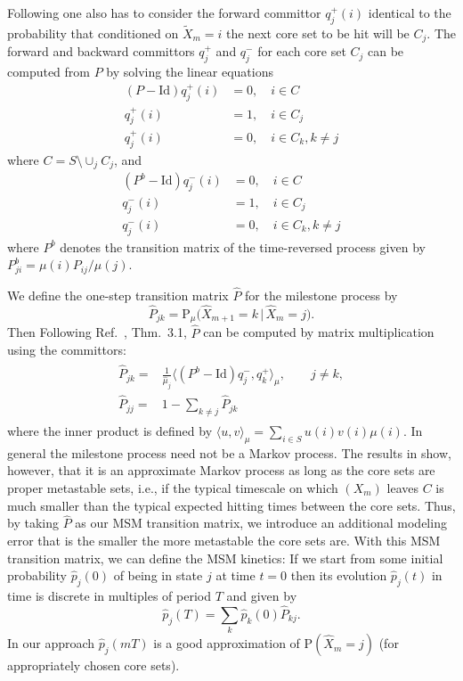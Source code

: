 \documentclass[journal=jctcce,manuscript=article]{achemso}
\newcommand{\vect}[1]{#1}
\newcommand{\fwd}[0]{+}
\newcommand{\bwd}[0]{-}
\newcommand{\id}{\mathrm{Id}}
\newcommand{\prob}{\textrm{P}}
\begin{document}
Following \cite{discreteTPT} one also has to consider the forward committor $q^\fwd_j(i)$ identical to the probability  that conditioned on $\tilde X_m=i$ the next core set to be hit will be $C_j$.
The forward and backward committors $q^\fwd_j$ and $q^\bwd_j$  for each core set $C_j$ can be computed from $P$ by solving the linear equations \cite{discreteTPT}
\begin{align}
(P-\id) q^\fwd_j(i) & =  0, \quad i\in C\label{qfwd}\\
q^\fwd_j(i) & =  1,\quad i\in C_j\nonumber\\
q^\fwd_j(i) & =  0,\quad i\in C_k,k\not=j\nonumber
\end{align}
where $C=S\setminus\cup_j C_j$, and
\begin{align}
(P^b-\id) q^\bwd_j(i) & =  0, \quad i\in C\label{qbwd}\\
q^\bwd_j(i) & =  1,\quad i\in C_j\nonumber \\
q^\bwd_j(i) & =  0,\quad i\in C_k,k\not=j\nonumber
\end{align}
where $P^b$ denotes the transition matrix of the time-reversed process
given by $P^b_{ji}=\mu(i) P_{ij}/\mu(j)$.

We define the one-step transition matrix $\hat{\vect P}$ for the milestone process by
\begin{equation}\label{hatP_prob}
\hat{\vect P}_{jk}=\prob_\mu\Big(\hat{X}_{m+1}=k\,\vert\, \hat{X}_m=j\Big).
\end{equation}
Then Following
Ref.~\cite{djurdjevac2010markov}, Thm.~3.1, 
$\hat{\vect P}$ can be computed by matrix multiplication using the committors:
  \begin{align}
    \label{eq:msm-tmatrix-00}
    \begin{split}      
    \hat{\vect P}_{jk}
    = &
    \frac{1}{\hat{\mu}_j}
    \langle (\vect P^b - \id) q^\bwd_j,q^\fwd_k \rangle_\mu,\qquad j\not= k, \\    %
    \hat{\vect P}_{jj}
    =&
    1-\sum_{k\not=j} \hat{\vect P}_{jk}
    \end{split}
  \end{align}
where the inner product is defined by
$\langle u,v \rangle_\mu=\sum_{i\in S} u(i) v(i) \mu(i)$. 
In general the milestone process need not be a Markov process. The results in \cite{A19-31,sarich2014utilizing} show, however, that it is an approximate Markov process as long as the core sets are proper metastable sets, i.e., if the typical timescale on which $(X_m)$ leaves $C$ is much smaller than the typical expected hitting times between the core sets.
Thus, by taking $\hat{P}$ as our MSM transition matrix, we introduce an additional modeling error that is the smaller the more metastable the core sets are.
With this MSM transition matrix, we can define the MSM kinetics:
If we start from some initial probability $\hat{p}_j(0)$ of being in state $j$ at time $t=0$ then its evolution $\hat{p}_j(t)$ in time is discrete in multiples of period $T$ and given by
\begin{equation}\label{eq:num-29}
\hat{p}_j(T)=\sum_k \hat{p}_k(0)\hat{\vect P}_{kj}.
\end{equation}
In our approach $\hat p_j(mT)$ is a good approximation of $\prob(\hat{X}_m=j)$ (for appropriately chosen core sets).
\end{document}
